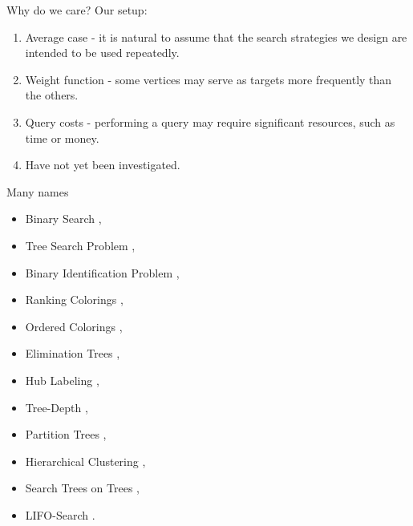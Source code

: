 \begin{frame}{Why do we care?}
Our setup:
\begin{enumerate}
    \item Average case - it is natural to assume that the search strategies we design are intended to be used repeatedly. 
    \item Weight function - some vertices may serve 
as targets more frequently than the others. 
    \item Query costs - performing a query may require 
significant resources, such as time or money. 
\item Have not yet been investigated.
\end{enumerate} 
\end{frame}

\begin{frame}{Many names}
\begin{itemize}
    \item Binary Search \cite{OnakParys2006GenOfBSSInTsAndFLikePosets,dereniowski2017ApproxSsForGeneralBSinWTs,Deligkas2019BsInGsRev,Emamjomeh2016DetAndProbBSinGs,dereniowski2022CFApproxAlgForBSInTsWithMonoQTimes,dereniowski2024SInTsMonoQTs,noisyBSSFC,Dereniowski2024OnMG,EfficientNoisyBinarySearch,Dereniowski2023Edge},
    \item Tree Search Problem \cite{Jacobs2010OnTheComplexSearchInTsAvg,Cicalese2014ImprovedApproxAvgTs,Cicalese2016OnTSPwNonUniCost}, 
    \item Binary Identification Problem \cite{Cicalese2012BinIdentPForWTs}, 
    \item Ranking Colorings \cite{Knuth1973,Dereniowski2009ERankOfWTs,DereniowskiERAndSInPOSets,DereniowskiEfPQProcByGRank,DereniowskiVxRankOfChGsAndWTs,Lam1998ERankOfGsIsH}, 
    \item Ordered Colorings \cite{KATCHALSKI1995141}, 
    \item Elimination Trees \cite{Pothen1988OptimalEliminationTrees}, 
    \item Hub Labeling \cite{Angelidakis2018ShortestPQ},
    \item Tree-Depth \cite{NESETRIL20061022,BOROWIECKI2023113682},
    \item Partition Trees \cite{Hgemo2024TightAB},
    \item Hierarchical Clustering \cite{Acostfunctionforsimilaritybasedhierarchicalclustering,HCObjFsandAlgs,Approximatehierarchicalclusteringviasparsestcutandspreadingmetrics}, 
    \item Search Trees on Trees \cite{SplayTonT,Fast_app_centroid_trees}, 
    \item LIFO-Search \cite{GIANNOPOULOU20122089}. 
\end{itemize}
\end{frame}

